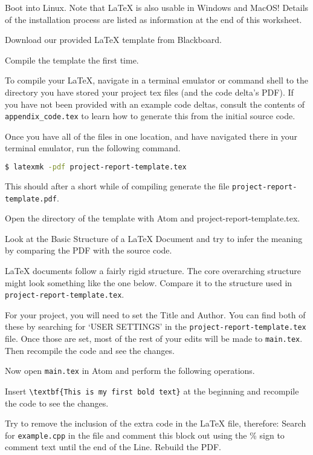 \begin{steps}
\item Boot into Linux. Note that \LaTeX{} is also usable in Windows and MacOS! Details of the installation process are listed as information at the end of this worksheet.
\item Download our provided \LaTeX{} template from Blackboard.
\item Compile the template the first time.

To compile your \LaTeX{}, navigate in a terminal emulator or command shell to the directory you have stored your project tex files (and the code delta's PDF). If you have not been provided with an example code deltas, consult the contents of \verb|appendix_code.tex| to learn how to generate this from the initial source code.

Once you have all of the files in one location, and have navigated there in your terminal emulator, run the following command.

\begin{lstlisting}[language=bash]
$ latexmk -pdf project-report-template.tex
\end{lstlisting}

This should after a short while of compiling generate the file \verb|project-report-template.pdf|.

\item Open the directory of the template with Atom and project-report-template.tex.

\item Look at the Basic Structure of a \LaTeX{} Document and try to infer the meaning by comparing the PDF with the source code.

\LaTeX{} documents follow a fairly rigid structure.
The core overarching structure might look something like the one below.
Compare it to the structure used in \verb|project-report-template.tex|.


\item For your project, you will need to set the Title and Author. You can find both of these by searching for `USER SETTINGS' in the \verb|project-report-template.tex| file.
Once those are set, most of the rest of your edits will be made to \verb|main.tex|.
Then recompile the code and see the changes.

\item Now open \verb|main.tex| in Atom and perform the following operations.

\item Insert \verb|\textbf{This is my first bold text}| at the beginning and recompile the code to see the changes.

\item Try to remove the inclusion of the extra code in the \LaTeX{} file, therefore: Search for \verb|example.cpp| in the file and comment this block out using the \% sign to comment text until the end of the Line. Rebuild the PDF.
\end{steps}

